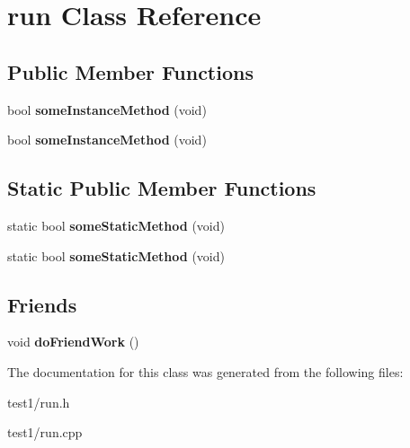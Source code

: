 \section{run Class Reference}
\label{classrun}
\subsection*{Public Member Functions}
\begin{DoxyCompactItemize}
\item 
bool {\bfseries some\+Instance\+Method} (void)\label{classrun_a162b830b8e841f16e2105897474607ee}

\item 
bool {\bfseries some\+Instance\+Method} (void)\label{classrun_a162b830b8e841f16e2105897474607ee}

\end{DoxyCompactItemize}
\subsection*{Static Public Member Functions}
\begin{DoxyCompactItemize}
\item 
static bool {\bfseries some\+Static\+Method} (void)\label{classrun_aecdf7f232968be0268b501308eb6f006}

\item 
static bool {\bfseries some\+Static\+Method} (void)\label{classrun_ad15a8e3eebd7c8c1dfdc6892018dac0a}

\end{DoxyCompactItemize}
\subsection*{Friends}
\begin{DoxyCompactItemize}
\item 
void {\bfseries do\+Friend\+Work} ()\label{classrun_aee9d1a0a49298091274b8487077f2710}

\end{DoxyCompactItemize}


The documentation for this class was generated from the following files\+:\begin{DoxyCompactItemize}
\item 
test1/run.\+h\item 
test1/run.\+cpp\end{DoxyCompactItemize}
